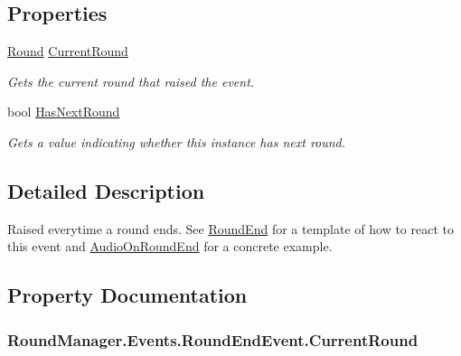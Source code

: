 \subsection*{Properties}
\begin{DoxyCompactItemize}
\item 
\hyperlink{class_round_manager_1_1_round}{Round} \hyperlink{class_round_manager_1_1_events_1_1_round_end_event_a338b191f540dc011bc488ac5035d6317}{Current\+Round}
\begin{DoxyCompactList}\small\item\em Gets the current round that raised the event. \end{DoxyCompactList}\item 
bool \hyperlink{class_round_manager_1_1_events_1_1_round_end_event_a7dd0fc823f150d965e48e4bfd0ce54be}{Has\+Next\+Round}
\begin{DoxyCompactList}\small\item\em Gets a value indicating whether this instance has next round. \end{DoxyCompactList}\end{DoxyCompactItemize}


\subsection{Detailed Description}
Raised everytime a round ends. See \hyperlink{class_round_manager_1_1_round_end}{Round\+End} for a template of how to react to this event and \hyperlink{class_round_manager_1_1_audio_on_round_end}{Audio\+On\+Round\+End} for a concrete example. 



\subsection{Property Documentation}
\hypertarget{class_round_manager_1_1_events_1_1_round_end_event_a338b191f540dc011bc488ac5035d6317}{}
\subsubsection[{Current\+Round}]{ Round\+Manager.\+Events.\+Round\+End\+Event.\+Current\+Round\hspace{0.3cm}{\ttfamily [get]}}\label{class_round_manager_1_1_events_1_1_round_end_event_a338b191f540dc011bc488ac5035d6317}


